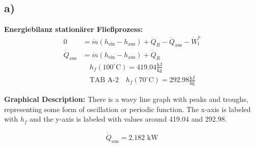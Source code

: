 

\subsection*{a)}
\textbf{Energiebilanz stationärer Fließprozess:}
\begin{align*}
0 &= \dot{m} (h_{\text{ein}} - h_{\text{aus}}) + \dot{Q}_R - \dot{Q}_{\text{aus}} - \dot{W}_t^o \\
\dot{Q}_{\text{aus}} &= \dot{m} (h_{\text{ein}} - h_{\text{aus}}) + \dot{Q}_R \\
& \quad h_f(100^\circ \text{C}) = 419.04 \frac{\text{kJ}}{\text{kg}} \\
& \quad \text{TAB A-2} \quad h_f(70^\circ \text{C}) = 292.98 \frac{\text{kJ}}{\text{kg}}
\end{align*}

\textbf{Graphical Description:}
There is a wavy line graph with peaks and troughs, representing some form of oscillation or periodic function. The x-axis is labeled with $h_f$ and the y-axis is labeled with values around 419.04 and 292.98.

\begin{align*}
\dot{Q}_{\text{aus}} = 2.182 \text{ kW}
\end{align*}